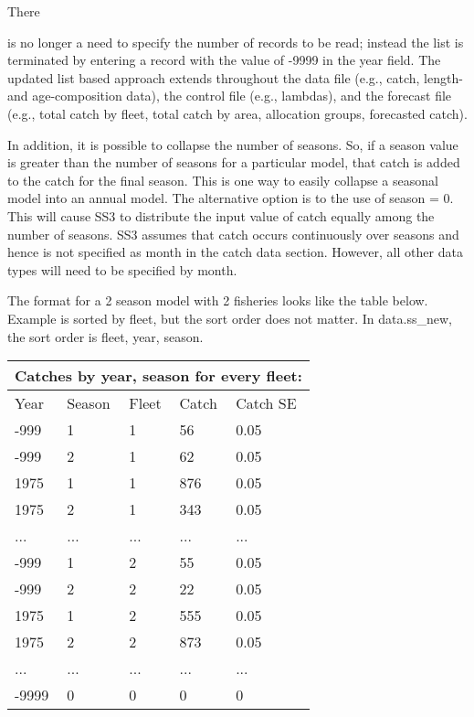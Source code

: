 \hypertarget{ListBased}{There} is no longer a need to specify the number of records to be read; instead the list is terminated by entering a record with the value of -9999 in the year field. The updated list based approach extends throughout the data file (e.g., catch, length- and age-composition data), the control file (e.g., lambdas), and the forecast file (e.g., total catch by fleet, total catch by area, allocation groups, forecasted catch).

In addition, it is possible to collapse the number of seasons.  So, if a season value is greater than the number of seasons for a particular model, that catch is added to the catch for the final season.  This is one way to easily collapse a seasonal model into an annual model.  The alternative option is to the use of season = 0.  This will cause SS3 to distribute the input value of catch equally among the number of seasons.  SS3 assumes that catch occurs continuously over seasons and hence is not specified as month in the catch data section.  However, all other data types will need to be specified by month.

The format for a 2 season model with 2 fisheries looks like the table below.  Example is sorted by fleet, but the sort order does not matter.  In data.ss\_new, the sort order is fleet, year, season.

\begin{center}
	\begin{tabular}{p{3cm} p{3cm} p{3cm} p{3cm} p{2cm}}
		\multicolumn{5}{l}{Catches by year, season for every fleet:}\\
		\hline
		Year & Season & Fleet & Catch & Catch SE \Tstrut\Bstrut\\
		\hline
		-999 & 1 & 1 & 56  & 0.05 \Tstrut\\
		-999 & 2 & 1 & 62  & 0.05 \\
		1975 & 1 & 1 & 876 & 0.05 \\
		1975 & 2 & 1 & 343 & 0.05 \\
		...  & ...   & ...   & ...   & ...  \\
		-999 & 1 & 2 & 55  & 0.05 \\
		-999 & 2 & 2 & 22  & 0.05 \\
		1975 & 1 & 2 & 555 & 0.05 \\
		1975 & 2 & 2 & 873 & 0.05 \\
		...  & ...   & ...   & ...   & ...  \\
		-9999 & 0 & 0 & 0 & 0 \Bstrut\\
		\hline
	\end{tabular}
\end{center}


